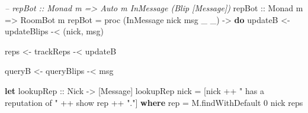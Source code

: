 \documentclass[]{article}
\newenvironment{Shaded}{}{}
\newcommand{\KeywordTok}[1]{\textcolor[rgb]{0.00,0.44,0.13}{\textbf{{#1}}}}
\newcommand{\DataTypeTok}[1]{\textcolor[rgb]{0.56,0.13,0.00}{{#1}}}
\newcommand{\DecValTok}[1]{\textcolor[rgb]{0.25,0.63,0.44}{{#1}}}
\newcommand{\StringTok}[1]{\textcolor[rgb]{0.25,0.44,0.63}{{#1}}}
\newcommand{\CommentTok}[1]{\textcolor[rgb]{0.38,0.63,0.69}{\textit{{#1}}}}
\newcommand{\OtherTok}[1]{\textcolor[rgb]{0.00,0.44,0.13}{{#1}}}
\newcommand{\FunctionTok}[1]{\textcolor[rgb]{0.02,0.16,0.49}{{#1}}}
\newcommand{\NormalTok}[1]{{#1}}
\begin{document}
\begin{Shaded}
\begin{Highlighting}[]
\CommentTok{-- repBot :: Monad m => Auto m InMessage (Blip [Message])}
\OtherTok{repBot ::} \DataTypeTok{Monad} \NormalTok{m }\OtherTok{=>} \DataTypeTok{RoomBot} \NormalTok{m}
\NormalTok{repBot }\FunctionTok{=} \NormalTok{proc (}\DataTypeTok{InMessage} \NormalTok{nick msg _ _) }\OtherTok{->} \KeywordTok{do}
    \NormalTok{updateB }\OtherTok{<-} \NormalTok{updateBlips }\FunctionTok{-<} \NormalTok{(nick, msg)}

    \NormalTok{reps    }\OtherTok{<-} \NormalTok{trackReps   }\FunctionTok{-<} \NormalTok{updateB}

    \NormalTok{queryB  }\OtherTok{<-} \NormalTok{queryBlips  }\FunctionTok{-<} \NormalTok{msg}

    \KeywordTok{let}\OtherTok{ lookupRep ::} \DataTypeTok{Nick} \OtherTok{->} \NormalTok{[}\DataTypeTok{Message}\NormalTok{]}
        \NormalTok{lookupRep nick }\FunctionTok{=} \NormalTok{[nick }\FunctionTok{++} \StringTok{" has a reputation of "} \FunctionTok{++} \NormalTok{show rep }\FunctionTok{++} \StringTok{"."}\NormalTok{]}
          \KeywordTok{where}
            \NormalTok{rep }\FunctionTok{=} \NormalTok{M.findWithDefault }\DecValTok{0} \NormalTok{nick reps}


\end{Highlighting}
\end{Shaded}
\end{document}
